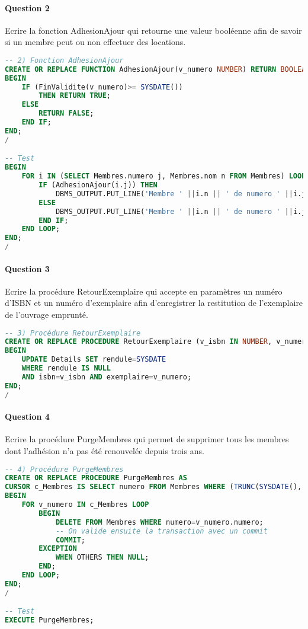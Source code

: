 \documentclass[10pt, oneside]{article}
\begin{document}

\paragraph{Question 2} Ecrire la fonction AdhesionAjour qui retourne une valeur booléenne afin de savoir si un membre peut ou non effectuer des locations.

\begin{lstlisting}[language=sql, title=Question 2, label=QV2]
-- 2) Fonction AdhesionAjour
CREATE OR REPLACE FUNCTION AdhesionAjour(v_numero NUMBER) RETURN BOOLEAN AS
BEGIN 
	IF (FinValidite(v_numero)>= SYSDATE())
		THEN RETURN TRUE;
	ELSE 
		RETURN FALSE;
	END IF;
END;
/

-- Test
BEGIN
	FOR i IN (SELECT Membres.numero j, Membres.nom n FROM Membres) LOOP
		IF (AdhesionAjour(i.j)) THEN
			DBMS_OUTPUT.PUT_LINE('Membre ' ||i.n || ' de numero ' ||i.j||' : adhesion a jour');
		ELSE
			DBMS_OUTPUT.PUT_LINE('Membre ' ||i.n || ' de numero ' ||i.j||' : adhesion pas a jour');
		END IF;
	END LOOP;
END;
/
\end{lstlisting}


\paragraph{Question 3} Ecrire la procédure RetourExemplaire qui accepte en paramètres un numéro d'ISBN et un numéro d'exemplaire afin d'enregistrer la restitution de l'exemplaire de l'ouvrage emprunté.

\begin{lstlisting}[language=sql, title=Question 3, label=QV3]
-- 3) Procédure RetourExemplaire
CREATE OR REPLACE PROCEDURE RetourExemplaire (v_isbn IN NUMBER, v_numero IN NUMBER) AS
BEGIN
	UPDATE Details SET rendule=SYSDATE
	WHERE rendule IS NULL
	AND isbn=v_isbn AND exemplaire=v_numero;
END;
/
\end{lstlisting}


\paragraph{Question 4} Ecrire la procédure PurgeMembres qui permet de supprimer tous les membres dont l'adhésion n'a pas été renouvelée depuis trois ans.

\begin{lstlisting}[language=sql, title=Question 4, label=QV4]
-- 4) Procédure PurgeMembres
CREATE OR REPLACE PROCEDURE PurgeMembres AS
CURSOR c_Membres IS SELECT numero FROM Membres WHERE (TRUNC(SYSDATE(), 'YYYY') - TRUNC(ADD_MONTHS(adhesion, duree), 'YYYY'))>3;
BEGIN 
	FOR v_numero IN c_Membres LOOP
		BEGIN
			DELETE FROM Membres WHERE numero=v_numero.numero;
			-- On valide ensuite la transaction avec un commit
			COMMIT;
		EXCEPTION	
			WHEN OTHERS THEN NULL;
		END;
	END LOOP;
END;
/

-- Test
EXECUTE PurgeMembres;
\end{lstlisting}
\end{document}
